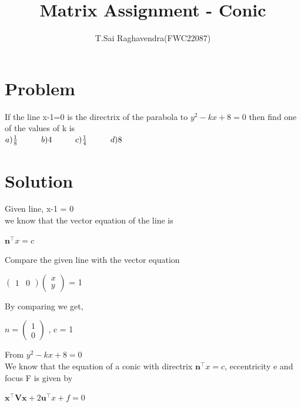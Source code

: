 \documentclass[journal,12pt,twocolumn]{IEEEtran}
\title{\mytitle}
\title{
Matrix Assignment - Conic
}
\author{T.Sai Raghavendra(FWC22087)}
\newcommand{\myvec}[1]{\ensuremath{\begin{pmatrix}#1\end{pmatrix}}}
\let\vec\mathbf
\begin{document}
\maketitle
\tableofcontents
\bigskip


\section{\textbf{Problem}}
If the line x-1=0 is the directrix of the parabola to $y^2-kx+8=0$ then find one of the values of k is\\
\hspace*{1.5cm} $a)\frac{1}{8} \hspace*{1cm} b)4\hspace*{1cm} c)\frac{1}{4} \hspace*{1cm}d)8$\\


\section{\textbf{Solution}}

Given line, x-1 = 0 \\
we know that the vector equation of the line is \\
\begin{center}
$\vec{n}^\top x = c$
\end{center}

Compare the given line with the vector equation \\

\begin{center}
$\myvec{1&0} \myvec{x\\y}$ = 1 \\
\end{center}

By comparing we get, \\

\begin{center}
$n = \myvec{1\\0}$ , c = 1 \\
\end{center}

From $y^2-kx+8=0$ \\

We know that the equation of a conic with directrix $\vec{n}^\top x = c$, eccentricity e and focus F is given by \\
\begin{center}
$\vec{x^\top Vx}+2\vec{u^\top}x+f = 0$ \\
\end{center}
\end{document}
